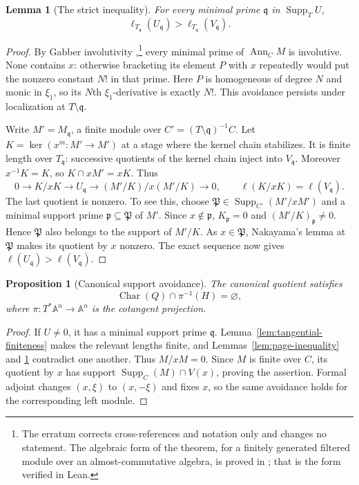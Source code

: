 \documentclass[11pt]{amsart}
\newtheorem{proposition}[theorem]{Proposition}
\newtheorem{lemma}[theorem]{Lemma}
\theoremstyle{definition}
\newcommand{\CharVar}{\operatorname{Char}}
\begin{document}
\begin{lemma}[The strict inequality]\label{lem:strict-support-inequality}
For every minimal prime $\mathfrak q$ in $\operatorname{Supp}_T U$,
\[
 \ell_{T_{\mathfrak q}}(U_{\mathfrak q})
 > \ell_{T_{\mathfrak q}}(V_{\mathfrak q}).
\]
\end{lemma}
\begin{proof}
By Gabber involutivity \cite{Gabber1981,Gabber1982},\footnote{The erratum
\cite{Gabber1982} corrects cross-references and notation only and changes no
statement. The algebraic form of the theorem, for a finitely generated
filtered module over an almost-commutative algebra, is proved in
\cite{SinghKumar2014}; that is the form verified in Lean.} every minimal
prime of $\operatorname{Ann}_C M$ is involutive. None contains $x$: otherwise
bracketing its element $P$ with $x$ repeatedly would put the nonzero
constant $N!$ in that prime. Here $P$ is homogeneous of degree $N$ and
monic in $\xi_1$, so its $N$th $\xi_1$-derivative is exactly $N!$.
This avoidance persists under localization at $T\setminus\mathfrak q$.

Write $M'=M_{\mathfrak q}$, a finite module over
$C'=(T\setminus\mathfrak q)^{-1}C$. Let $K=\ker(x^m:M'\to M')$
at a stage where the kernel chain stabilizes. It is finite length over
$T_{\mathfrak q}$: successive quotients of the kernel chain inject into
$V_{\mathfrak q}$. Moreover $x^{-1}K=K$, so $K\cap xM'=xK$.
Thus
\[
 0\longrightarrow K/xK\longrightarrow U_{\mathfrak q}
 \longrightarrow (M'/K)/x(M'/K)\longrightarrow0,
 \qquad \ell(K/xK)=\ell(V_{\mathfrak q}).
\]
The last quotient is nonzero. To see this, choose
$\mathfrak P\in\operatorname{Supp}_{C'}(M'/xM')$ and a minimal support
prime $\mathfrak p\subseteq\mathfrak P$ of $M'$. Since $x\notin\mathfrak p$,
$K_{\mathfrak p}=0$ and $(M'/K)_{\mathfrak p}\ne0$. Hence
$\mathfrak P$ also belongs to the support of $M'/K$. As $x\in\mathfrak P$,
Nakayama's lemma at $\mathfrak P$ makes its quotient by $x$ nonzero.
The exact sequence now gives
$\ell(U_{\mathfrak q})>\ell(V_{\mathfrak q})$.

\end{proof}

\begin{proposition}[Canonical support avoidance]\label{prop:char-avoids}
The canonical quotient satisfies
\[
 \CharVar(Q)\cap\pi^{-1}(H)=\varnothing,
 \tag{3.5}\label{eq:char-avoids}
\]
where $\pi:T^*\mathbb A^n\to\mathbb A^n$ is the cotangent projection.
\end{proposition}
\begin{proof}
If $U\ne0$, it has a minimal support prime $\mathfrak q$.
Lemma~\ref{lem:tangential-finiteness} makes the relevant lengths finite,
and Lemmas~\ref{lem:page-inequality} and
\ref{lem:strict-support-inequality} contradict one another.
Thus $M/xM=0$. Since $M$ is finite over $C$, its quotient by $x$ has
support $\operatorname{Supp}_C(M)\cap V(x)$, proving the assertion.
Formal adjoint changes $(x,\xi)$ to $(x,-\xi)$ and fixes $x$, so the same
avoidance holds for the corresponding left module.
\end{proof}
\end{document}
